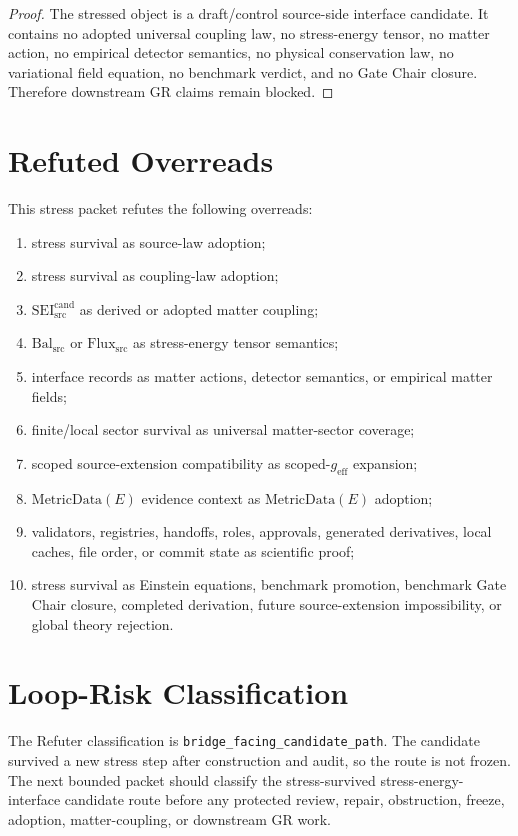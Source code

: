 \documentclass[11pt]{article}
\newcommand{\MetricData}{\mathrm{MetricData}}
\newcommand{\geff}{g_{\mathrm{eff}}}
\newcommand{\SEICand}{\mathrm{SEI}_{\mathrm{src}}^{\mathrm{cand}}}
\newcommand{\BalSrc}{\mathrm{Bal}_{\mathrm{src}}}
\newcommand{\FluxSrc}{\mathrm{Flux}_{\mathrm{src}}}
\begin{document}
\begin{proof}
The stressed object is a draft/control source-side interface candidate. It
contains no adopted universal coupling law, no stress-energy tensor, no
matter action, no empirical detector semantics, no physical conservation law,
no variational field equation, no benchmark verdict, and no Gate Chair
closure. Therefore downstream GR claims remain blocked.
\end{proof}

\section{Refuted Overreads}

This stress packet refutes the following overreads:
\begin{enumerate}[leftmargin=*]
  \item stress survival as source-law adoption;
  \item stress survival as coupling-law adoption;
  \item \(\SEICand\) as derived or adopted matter coupling;
  \item \(\BalSrc\) or \(\FluxSrc\) as stress-energy tensor semantics;
  \item interface records as matter actions, detector semantics, or empirical
  matter fields;
  \item finite/local sector survival as universal matter-sector coverage;
  \item scoped source-extension compatibility as scoped-\(\geff\) expansion;
  \item \(\MetricData(E)\) evidence context as \(\MetricData(E)\) adoption;
  \item validators, registries, handoffs, roles, approvals, generated
  derivatives, local caches, file order, or commit state as scientific proof;
  \item stress survival as Einstein equations, benchmark promotion, benchmark
  Gate Chair closure, completed derivation, future source-extension
  impossibility, or global theory rejection.
\end{enumerate}

\section{Loop-Risk Classification}

The Refuter classification is \texttt{bridge\_facing\_candidate\_path}. The
candidate survived a new stress step after construction and audit, so the
route is not frozen. The next bounded packet should classify the
stress-survived stress-energy-interface candidate route before any protected
review, repair, obstruction, freeze, adoption, matter-coupling, or downstream
GR work.
\end{document}
